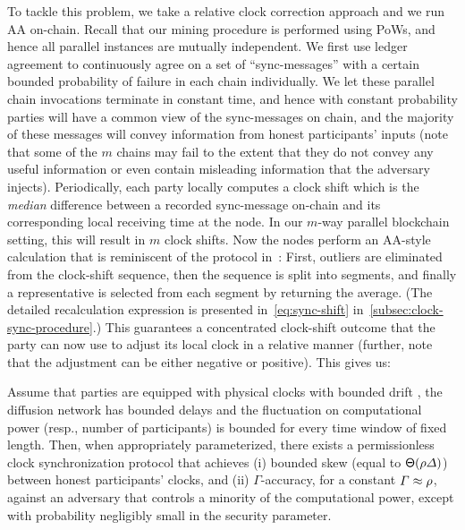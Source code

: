 To tackle this problem, we take a relative clock correction approach and we run AA on-chain.
%
Recall that our mining procedure is performed using \mforone PoWs, and hence all parallel instances are mutually independent.
%
We first use ledger agreement to continuously agree on a set of ``sync-messages''  with a certain bounded probability of failure in each chain individually.
%
We let these parallel chain invocations terminate in constant time, and hence with constant probability parties will have a common view of the sync-messages on chain, and the majority of these messages will convey information from honest participants' inputs (note that some of the $m$ chains may fail to the extent that they do not convey any useful information or even contain misleading information that the adversary injects).
%
Periodically, each party locally computes a clock shift which is the \emph{median} difference between a recorded sync-message on-chain and its corresponding local receiving time at the node.
%
In our $m$-way parallel blockchain setting, this will result in $m$ clock shifts.
%
Now the nodes perform an AA-style calculation that is reminiscent of the protocol in~\cite{JACM:DLPSW86}:
%
First, outliers are eliminated from the clock-shift sequence, then the sequence is split into segments, and finally a representative is selected from each segment by returning the average.
%
(The detailed recalculation expression is presented in~\cref{eq:sync-shift} in~\cref{subsec:clock-sync-procedure}.)
%
This guarantees a concentrated clock-shift outcome that the party can now use to adjust its local clock in a relative manner (further, note that the adjustment can be either negative or positive).
%
This gives us:
%
\begin{lemma}[Informal]
    Assume that parties are equipped with physical clocks with bounded drift \clockDrift, the diffusion network has bounded delays \delay and the fluctuation on computational power (resp., number of participants) is bounded for every time window of fixed length.
    Then, when appropriately parameterized, there exists a permissionless clock synchronization protocol that achieves (i) bounded skew (equal to $\mathsf{\Theta}(\rho \varDelta)$) between honest participants' clocks, and (ii)
    $\varGamma$-accuracy, for a constant $\varGamma \approx \rho$, against an adversary that controls a minority of the computational power, except with probability negligibly small in the security parameter.
\end{lemma}

